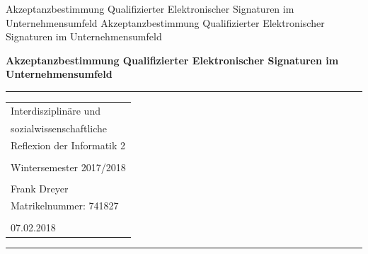 \documentclass[deutsch]{lib/llncs/llncs}
\begin{document}
\markboth
{Akzeptanzbestimmung Qualifizierter Elektronischer Signaturen im Unternehmensumfeld}
{Akzeptanzbestimmung Qualifizierter Elektronischer Signaturen im Unternehmensumfeld}
\thispagestyle{empty}


\begin{flushleft}
\LARGE\bfseries Akzeptanzbestimmung Qualifizierter Elektronischer Signaturen im Unternehmensumfeld


\end{flushleft}
\rule{\textwidth}{1pt}
\vspace{2pt}


\begin{flushright}
\Huge


\begin{tabular}{@{}l}
Interdisziplinäre und \\
sozialwissenschaftliche \\
Reflexion der Informatik 2\\\\
Wintersemester 2017/2018\\\\
Frank Dreyer\\
Matrikelnummer: 741827\\\\
07.02.2018\\[6pt]
\end{tabular}


\end{flushright}
\rule{\textwidth}{1pt}
\vfill

\newpage
\tableofcontents
\newpage\vspace{2pt}
\end{document}
